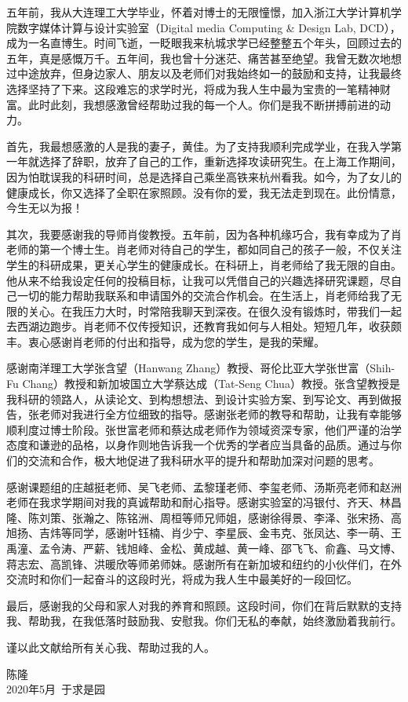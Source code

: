 \begin{thanks}

五年前，我从大连理工大学毕业，怀着对博士的无限憧憬，加入浙江大学计算机学院数字媒体计算与设计实验室（Digital media Computing \& Design Lab, DCD），成为一名直博生。时间飞逝，一眨眼我来杭城求学已经整整五个年头，回顾过去的五年，真是感慨万千。五年间，我也曾十分迷茫、痛苦甚至绝望。我曾无数次地想过中途放弃，但身边家人、朋友以及老师们对我始终如一的鼓励和支持，让我最终选择坚持了下来。这段难忘的求学时光，将成为我人生中最为宝贵的一笔精神财富。此时此刻，我想感激曾经帮助过我的每一个人。你们是我不断拼搏前进的动力。

首先，我最想感激的人是我的妻子，黄佳。为了支持我顺利完成学业，在我入学第一年就选择了辞职，放弃了自己的工作，重新选择攻读研究生。在上海工作期间，因为怕耽误我的科研时间，总是选择自己乘坐高铁来杭州看我。如今，为了女儿的健康成长，你又选择了全职在家照顾。没有你的爱，我无法走到现在。此份情意，今生无以为报！

其次，我要感谢我的导师肖俊教授。五年前，因为各种机缘巧合，我有幸成为了肖老师的第一个博士生。肖老师对待自己的学生，都如同自己的孩子一般，不仅关注学生的科研成果，更关心学生的健康成长。在科研上，肖老师给了我无限的自由。他从来不给我设定任何的投稿目标，让我可以凭借自己的兴趣选择研究课题，尽自己一切的能力帮助我联系和申请国外的交流合作机会。在生活上，肖老师给我了无限的关心。在我压力大时，时常陪我聊天到深夜。在很久没有锻炼时，带我们一起去西湖边跑步。肖老师不仅传授知识，还教育我如何与人相处。短短几年，收获颇丰。衷心感谢肖老师的付出和指导，成为您的学生，是我的荣耀。

感谢南洋理工大学张含望（Hanwang Zhang）教授、哥伦比亚大学张世富（Shih-Fu Chang）教授和新加坡国立大学蔡达成（Tat-Seng Chua）教授。张含望教授是我科研的领路人，从读论文、到构想想法、到设计实验方案、到写论文、再到做报告，张老师对我进行全方位细致的指导。感谢张老师的教导和帮助，让我有幸能够顺利度过博士阶段。张世富老师和蔡达成老师作为领域资深专家，他们严谨的治学态度和谦逊的品格，以身作则地告诉我一个优秀的学者应当具备的品质。通过与你们的交流和合作，极大地促进了我科研水平的提升和帮助加深对问题的思考。

感谢课题组的庄越挺老师、吴飞老师、孟黎瑾老师、李玺老师、汤斯亮老师和赵洲老师在我求学期间对我的真诚帮助和耐心指导。感谢实验室的冯银付、齐天、林昌隆、陈刘策、张瀚之、陈铭洲、周桓等师兄师姐，感谢徐得景、李泽、张宋扬、高旭扬、吉炜等同学，感谢叶钰楠、肖少宁、李星辰、金韦克、张凤达、李一萌、王禹潼、孟令涛、严薪、钱旭峰、金松、黄成越、黄一峰、邵飞飞、俞鑫、马文博、蒋志宏、高凯锋、洪暖欣等师弟师妹。感谢所有在新加坡和纽约的小伙伴们，在外交流时和你们一起奋斗的这段时光，将成为我人生中最美好的一段回忆。

最后，感谢我的父母和家人对我的养育和照顾。这段时间，你们在背后默默的支持我、帮助我，在我低落时鼓励我、安慰我。你们无私的奉献，始终激励着我前行。

谨以此文献给所有关心我、帮助过我的人。

\begin{flushright}
	\begin{minipage}{12em}
	\begin{center}
		陈隆
		\\ 2020年5月\ 于求是园
	\end{center}
	\end{minipage}
\end{flushright}

\end{thanks}
